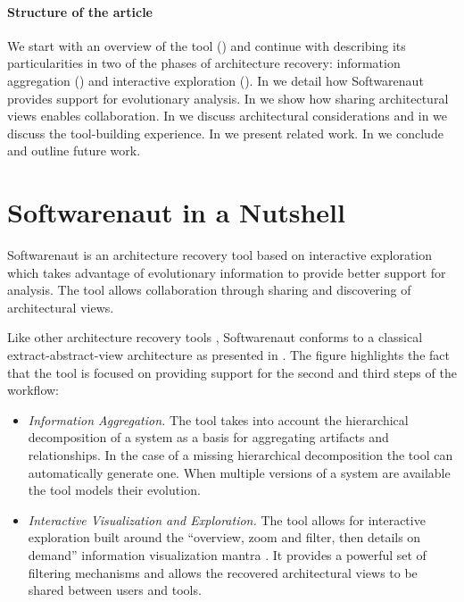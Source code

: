 \documentclass[preprint,12pt]{elsarticle}
\begin{document}
\paragraph{Structure of the article} We start with an overview of the tool () and continue with describing its particularities in two of the phases of architecture recovery: information aggregation () and interactive exploration (). In  we detail how Softwarenaut provides support for evolutionary analysis. In  we show how sharing architectural views enables collaboration. In  we discuss architectural considerations and in  we discuss the tool-building experience. In  we present related work. In  we conclude and outline future work.

\section {Softwarenaut in a Nutshell} \label{sec:over}

Softwarenaut is an architecture recovery tool based on interactive exploration which takes advantage of evolutionary information to provide better support for analysis. The tool allows collaboration through sharing and discovering of architectural views. 




Like other architecture recovery tools \cite{pollet-sar}, Softwarenaut conforms to a classical extract-abstract-view architecture as presented in . The figure highlights the fact that the tool is focused on providing support for the second and third steps of the workflow: 


\begin{itemize}
\item {\em Information Aggregation.} The tool takes into account the hierarchical decomposition of a system as a basis for aggregating artifacts and relationships. In the case of a missing hierarchical decomposition the tool can automatically generate one. When multiple versions of a system are available the tool models their evolution.
\item {\em Interactive Visualization and Exploration.} The tool allows for interactive exploration built around the ``overview, zoom and filter, then details on demand'' information visualization mantra \cite{shneid-eyes}. It provides a powerful set of filtering mechanisms and allows the recovered architectural views to be shared between users and tools.
\end{itemize}
\end{document}
